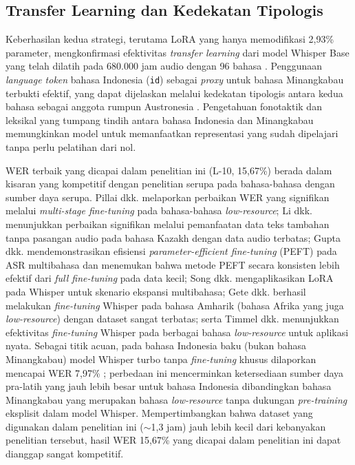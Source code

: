 \subsection{Transfer Learning dan Kedekatan Tipologis}

Keberhasilan kedua strategi, terutama LoRA yang hanya memodifikasi 2,93\% parameter, mengkonfirmasi efektivitas \textit{transfer learning} \cite{pan2010transfer} dari model Whisper Base yang telah dilatih pada 680.000 jam audio dengan 96 bahasa \cite{radford2023whisper}. Penggunaan \textit{language token} bahasa Indonesia (\texttt{id}) sebagai \textit{proxy} untuk bahasa Minangkabau terbukti efektif, yang dapat dijelaskan melalui kedekatan tipologis antara kedua bahasa sebagai anggota rumpun Austronesia \cite{koto2020minangkabau}. Pengetahuan fonotaktik dan leksikal yang tumpang tindih antara bahasa Indonesia dan Minangkabau memungkinkan model untuk memanfaatkan representasi yang sudah dipelajari tanpa perlu pelatihan dari nol.

WER terbaik yang dicapai dalam penelitian ini (L-10, 15,67\%) berada dalam kisaran yang kompetitif dengan penelitian serupa pada bahasa-bahasa dengan sumber daya serupa. Pillai dkk. \cite{pillai2024multistage} melaporkan perbaikan WER yang signifikan melalui \textit{multi-stage fine-tuning} pada bahasa-bahasa \textit{low-resource}; Li dkk. \cite{li2024improving} menunjukkan perbaikan signifikan melalui pemanfaatan data teks tambahan tanpa pasangan audio pada bahasa Kazakh dengan data audio terbatas; Gupta dkk. \cite{gupta2024parameter} mendemonstrasikan efisiensi \textit{parameter-efficient fine-tuning} (PEFT) pada ASR multibahasa dan menemukan bahwa metode PEFT secara konsisten lebih efektif dari \textit{full fine-tuning} pada data kecil; Song dkk. \cite{song2024lorawhisper} mengaplikasikan LoRA pada Whisper untuk skenario ekspansi multibahasa; Gete dkk. \cite{gete2025whispering} berhasil melakukan \textit{fine-tuning} Whisper pada bahasa Amharik (bahasa Afrika yang juga \textit{low-resource}) dengan dataset sangat terbatas; serta Timmel dkk. \cite{timmel2024finetune} menunjukkan efektivitas \textit{fine-tuning} Whisper pada berbagai bahasa \textit{low-resource} untuk aplikasi nyata. Sebagai titik acuan, pada bahasa Indonesia baku (bukan bahasa Minangkabau) model Whisper turbo tanpa \textit{fine-tuning} khusus dilaporkan mencapai WER 7,97\% \cite{martin2026speechsummary}; perbedaan ini mencerminkan ketersediaan sumber daya pra-latih yang jauh lebih besar untuk bahasa Indonesia dibandingkan bahasa Minangkabau yang merupakan bahasa \textit{low-resource} tanpa dukungan \textit{pre-training} eksplisit dalam model Whisper. Mempertimbangkan bahwa dataset yang digunakan dalam penelitian ini ($\sim$1,3 jam) jauh lebih kecil dari kebanyakan penelitian tersebut, hasil WER 15,67\% yang dicapai dalam penelitian ini dapat dianggap sangat kompetitif.

